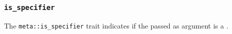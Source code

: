 
\subsubsection{\texttt{is\_specifier}}

The \texttt{meta::is\_specifier}
trait indicates if the  passed as argument is a .


